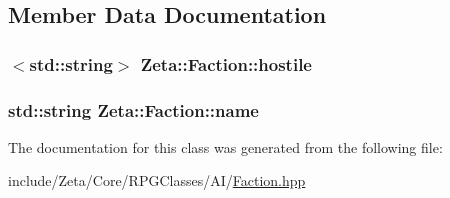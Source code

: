 \subsection{Member Data Documentation}
\hypertarget{classZeta_1_1Faction_a3155b01010dbaba9b6143fab550a4885}{
\subsubsection[{hostile}]{$<$std\+::string$>$ Zeta\+::\+Faction\+::hostile\hspace{0.3cm}{\ttfamily [private]}}}\label{classZeta_1_1Faction_a3155b01010dbaba9b6143fab550a4885}
\hypertarget{classZeta_1_1Faction_aff5abc55d9c2e0ae29d2560c633ceb1e}{
\subsubsection[{name}]{\setlength{\rightskip}{0pt plus 5cm}std\+::string Zeta\+::\+Faction\+::name\hspace{0.3cm}{\ttfamily [private]}}}\label{classZeta_1_1Faction_aff5abc55d9c2e0ae29d2560c633ceb1e}


The documentation for this class was generated from the following file\+:\begin{DoxyCompactItemize}
\item 
include/\+Zeta/\+Core/\+R\+P\+G\+Classes/\+A\+I/\hyperlink{Faction_8hpp}{Faction.\+hpp}\end{DoxyCompactItemize}
